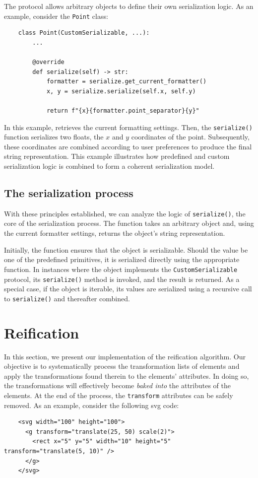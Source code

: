 The protocol allows arbitrary objects to define their own serialization logic. As an example, consider the \texttt{Point} class:

\begin{verbatim}
    class Point(CustomSerializable, ...):
        ...

        @override
        def serialize(self) -> str:
            formatter = serialize.get_current_formatter()
            x, y = serialize.serialize(self.x, self.y)

            return f"{x}{formatter.point_separator}{y}"
\end{verbatim}

In this example,  retrieves the current formatting settings. Then, the \texttt{serialize()} function serializes two floats, the $x$ and $y$ coordinates of the point. Subsequently, these coordinates are combined according to user preferences to produce the final string representation. This example illustrates how predefined and custom serialization logic is combined to form a coherent serialization model.

\subsection{The serialization process}

With these principles established, we can analyze the logic of \texttt{serialize()}, the core of the serialization process. The function takes an arbitrary object and, using the current formatter settings, returns the object's string representation.

Initially, the function ensures that the object is serializable. Should the value be one of the predefined primitives, it is serialized directly using the appropriate function. In instances where the object implements the \texttt{CustomSerializable} protocol, its \texttt{serialize()} method is invoked, and the result is returned. As a special case, if the object is iterable, its values are serialized using a recursive call to \texttt{serialize()} and thereafter combined.

\section{Reification}\label{reify}

In this section, we present our implementation of the reification algorithm. Our objective is to systematically process the transformation lists of elements and apply the transformations found therein to the elements' attributes. In doing so, the transformations will effectively become \emph{baked into} the attributes of the elements. At the end of the process, the \texttt{transform} attributes can be safely removed. As an example, consider the following \gls{svg} code:
\begin{verbatim}
    <svg width="100" height="100">
      <g transform="translate(25, 50) scale(2)">
        <rect x="5" y="5" width="10" height="5" transform="translate(5, 10)" />
      </g>
    </svg>
\end{verbatim}

